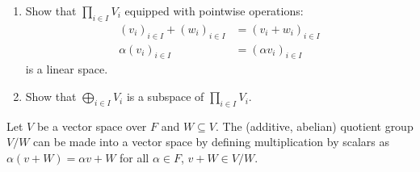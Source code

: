     \begin{exercise}
        \phantom{a}
        \begin{enumerate}[label = (\arabic*),itemsep=1pt,topsep=3pt]
            \item Show that $\prod_{i \in I}V_i$ equipped with pointwise operations:
                \begin{equation*}
                \begin{split}
                    (v_i)_{i \in I} + (w_i)_{i \in I} &= (v_i + w_i)_{i \in I} \\
                    \alpha(v_i)_{i \in I} &= (\alpha v_i)_{i \in I}
                \end{split}
                \end{equation*}
            is a linear space.

            \item Show that $\bigoplus_{i \in I}V_i$ is a subspace of $\prod_{i \in I}V_i$.
        \end{enumerate}
    \end{exercise}

    \begin{proposition}
        Let $V$ be a vector space over $F$ and $W \subseteq V$. The (additive, abelian) quotient group $V/W$ can be made into a vector space by defining multiplication by scalars as $\alpha(v + W) = \alpha v + W$ for all $\alpha \in F$, $v + W \in V/W$.
    \end{proposition}

